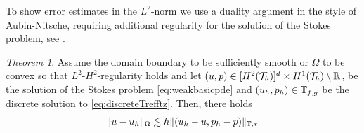 \documentclass[pdflatex,sn-mathphys,Numbered]{sn-jnl}%
\theoremstyle{remark}%
\newtheorem{theorem}{Theorem}%
\theoremstyle{definition}%
\begin{document}
To show error estimates in the $L^2$-norm we use a duality argument in the style of Aubin-Nitsche, requiring additional regularity for the solution of the Stokes problem, see \cite{10.3792/pjaa.67.171}.

\begin{theorem} \label{th::aubin}
  Assume the domain boundary to be sufficiently smooth or $\Omega$ to
  be convex so that $L^2$-$H^2$-regularity holds and let $(u,p) \in
  [H^{2}({\mathcal{T}_h})]^d \times H^{1}({\mathcal{T}_h}) \setminus \mathbb{R}$, be the solution of
  the Stokes problem \eqref{eq:weakbasicpde} and $(u_h,p_h) \in
  \mathbb{T}_{f,g}$ be the discrete solution to \eqref{eq:discreteTrefftz}.
  Then, there holds
  \begin{equation} \label{eq::aubinerror}
    \Vert u-u_h \Vert_{\Omega} \lesssim h \Vert (u_h-u,p_h-p) \Vert_{\mathbb{T},\ast}
  \end{equation}
\end{theorem}
\end{document}
